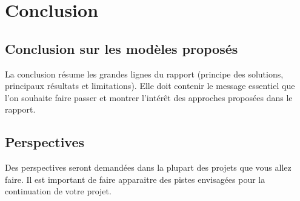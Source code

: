 
\chapter{Conclusion}
\label{ch:Conclusion} 

\section{Conclusion sur les modèles proposés}
La conclusion résume les grandes lignes du rapport (principe des solutions, principaux résultats et limitations). Elle doit contenir le message essentiel que l’on souhaite faire passer et montrer l’intérêt des approches proposées dans le rapport.

\section{Perspectives}
Des perspectives seront demandées dans la plupart des projets que vous allez faire. Il est important de faire apparaitre des pistes envisagées pour la continuation de votre projet.

